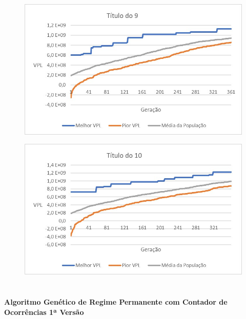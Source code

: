 \documentclass[12pt,a4paper]{report}
\begin{document}
\begin{figure}[H]
\centering

\includegraphics[scale=1]{ApD/9}

\end{figure}

\begin{figure}[H]
\centering

\includegraphics[scale=1]{ApD/10}

\end{figure}

\chapter{}
\subsubsection{Algoritmo Genético de Regime Permanente com Contador de Ocorrências 1ª Versão}
\end{document}
